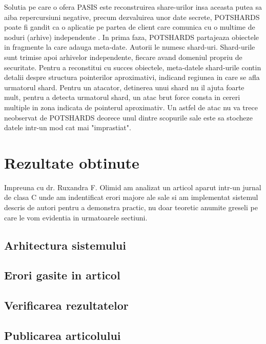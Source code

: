 \documentclass{llncs}
\begin{document}
Solutia pe care o ofera PASIS este reconstruirea share-urilor insa aceasta putea sa aiba repercursiuni negative, precum dezvaluirea unor date secrete,
POTSHARDS poate fi gandit ca o aplicatie pe partea de client care comunica cu o multime de noduri (arhive) independente . In prima faza, POTSHARDS partajeaza obiectele in fragmente la care adauga meta-date. Autorii le numesc shard-uri. Shard-urile sunt trimise apoi arhivelor independente, fiecare avand domeniul propriu de securitate. Pentru a reconstitui cu succes obiectele, meta-datele shard-urile contin detalii despre structura pointerilor aproximativi, indicand regiunea in care se afla urmatorul shard. Pentru un atacator, detinerea unui shard nu il ajuta foarte mult, pentru a detecta urmatorul shard, un atac brut force consta in cereri multiple in zona indicata de pointerul aproximativ. Un astfel de atac nu va trece neobservat de POTSHARDS deorece unul dintre scopurile sale este sa stocheze datele intr-un mod cat mai "imprastiat".\cite{SGMV:2009} 

\section{Rezultate obtinute}
Impreuna cu dr. Ruxandra F. Olimid am analizat un articol aparut intr-un jurnal de clasa C unde am indentificat erori majore ale sale si am implementat sistemul descris de autori pentru a demonstra practic, nu doar teoretic anumite greseli pe care le vom evidentia in urmatoarele sectiuni. \cite{AAMK:2013}

\label{sec:results}
\subsection{Arhitectura sistemului}

\subsection{Erori gasite in articol}
\subsection{Verificarea rezultatelor}
\subsection{Publicarea articolului}

%
%
%



\end{document}
